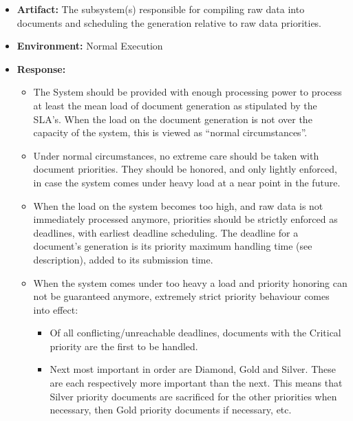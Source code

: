 \documentclass[a4paper,10pt]{article}
\begin{document}
\begin{itemize}
    \item \textbf{Artifact:} The subsystem(s) responsible for compiling raw data into documents and scheduling the generation relative to raw data priorities.
    \item \textbf{Environment:} Normal Execution
    \item \textbf{Response:}
        \begin{itemize}
            \item The System should be provided with enough processing power to process at least the mean load of document generation as stipulated by the SLA's. When the load on the document generation is not over the capacity of the system, this is viewed as ``normal circumstances''.
            \item Under normal circumstances, no extreme care should be taken with document priorities. They should be honored, and only lightly enforced, in case the system comes under heavy load at a near point in the future.
            \item When the load on the system becomes too high, and raw data is not immediately processed anymore, priorities should be strictly enforced as deadlines, with earliest deadline scheduling. The deadline for a document's generation is its priority maximum handling time (see description), added to its submission time.
            \item When the system comes under too heavy a load and priority honoring can not be guaranteed anymore, extremely strict priority behaviour comes into effect:
            \begin{itemize}
                \item Of all conflicting/unreachable deadlines, documents with the Critical priority are the first to be handled.
                \item Next most important in order are Diamond, Gold and Silver. These are each respectively more important than the next. This means that Silver priority documents are sacrificed for the other priorities when necessary, then Gold priority documents if necessary, etc.
            \end{itemize}
        \end{itemize}


\end{itemize}
\end{document}
